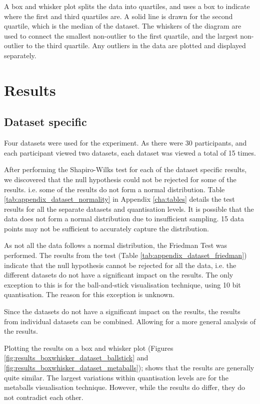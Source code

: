 A box and whisker plot splits the data into quartiles, and uses a box to
indicate where the first and third quartiles are. A solid line is drawn for the
second quartile, which is the median of the dataset. The whiskers of the
diagram are used to connect the smallest non-outlier to the first quartile, and
the largest non-outlier to the third quartile. Any outliers in the data are
plotted and displayed separately.


\section{Results}
\label{sec:results_results}

\subsection*{Dataset specific}
\label{sub:results_results_dataset}

Four datasets were used for the experiment. As there were 30 participants, and
each participant viewed two datasets, each dataset was viewed a total of 15
times.

After performing the Shapiro-Wilks test for each of the dataset specific
results, we discovered that the null hypothesis could not be rejected for some
of the results. i.e. some of the results do not form a normal distribution.
Table \ref{tab:appendix_dataset_normality} in Appendix \ref{cha:tables} details
the test results for all the separate datasets and quantisation levels. It is
possible that the data does not form a normal distribution due to insufficient
sampling. 15 data points may not be sufficient to accurately capture the
distribution.

As not all the data follows a normal distribution, the Friedman Test was
performed. The results from the test (Table
\ref{tab:appendix_dataset_friedman}) indicate that the null hypothesis cannot
be rejected for all the data, i.e. the different datasets do not have a
significant impact on the results. The only exception to this is for the
ball-and-stick visualisation technique, using 10 bit quantisation. The reason
for this exception is unknown.

Since the datasets do not have a significant impact on the results, the results
from individual datasets can be combined. Allowing for a more general analysis
of the results.

Plotting the results on a box and whisker plot (Figures
\ref{fig:results_boxwhisker_dataset_ballstick} and
\ref{fig:results_boxwhisker_dataset_metaballs}); shows that the results are
generally quite similar. The largest variations within quantisation levels are
for the metaballs visualisation technique. However, while the results do
differ, they do not contradict each other.

